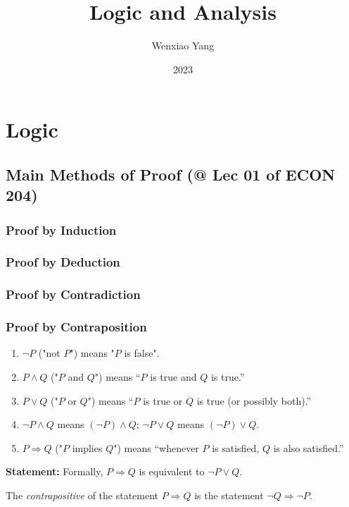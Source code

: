 \documentclass[11pt]{elegantbook}
\title{\textbf{Logic and Analysis}}
\author{Wenxiao Yang}
\institute{Haas School of Business, University of California Berkeley}
\date{2023}
\begin{document}
\maketitle
\frontmatter
\tableofcontents
\mainmatter


\chapter{Logic}
\section{Main Methods of Proof \small{ (@ Lec 01 of ECON 204)}}
\subsection{Proof by Induction}
\subsection{Proof by Deduction}
\subsection{Proof by Contradiction}
\subsection{Proof by Contraposition}
\begin{enumerate}[$\circ$]
    \item $\lnot P$ ("not $P$") means "$P$ is false".
    \item $P \wedge Q$ ("$P$ and $Q$") means “$P$ is true and $Q$ is true.”
    \item $P \vee Q$ ("$P$ or $Q$") means “$P$ is true or $Q$ is true (or possibly both).”
    \item $\lnot P \wedge Q$ means $(\lnot P)\wedge Q$; $\lnot P \vee Q$ means $(\lnot P)\vee Q$.
    \item $P \Rightarrow Q$ ("$P$ implies $Q$") means “whenever $P$ is satisfied, $Q$ is also satisfied.”
\end{enumerate}
\textbf{Statement:} Formally, $P \Rightarrow Q$ is equivalent to $\lnot P \vee Q$.

\begin{definition}[Contrapositive]
\normalfont
The \textit{contrapositive} of the statement $P \Rightarrow Q$ is the statement $\lnot Q \Rightarrow \lnot P$.
\end{definition}
\end{document}
